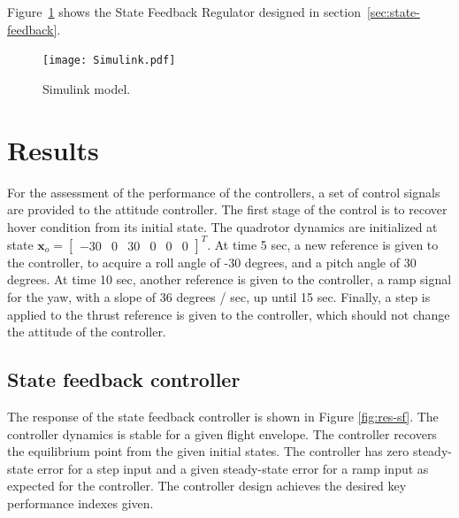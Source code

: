 \documentclass[12pt]{article}
\begin{document}
Figure~\ref{fig:simulink} shows the State Feedback Regulator designed in section~\ref{sec:state-feedback}. 

\begin{figure}
  \centering
  \texttt{[image: Simulink.pdf]}
  \caption{Simulink model.}
  \label{fig:simulink}
\end{figure}

\section{Results}

For the assessment of the performance of the controllers, a set of control signals are provided to the attitude controller. The first stage of the control is to recover hover condition from its initial state. The quadrotor dynamics are initialized at state $ \mathbf{x}_o = \begin{bmatrix} -30 & 0 & 30 & 0 & 0 & 0 \end{bmatrix}^T $. At time 5 sec, a new reference is given to the controller, to acquire a roll angle of -30 degrees, and a pitch angle of 30 degrees. At time 10 sec, another reference is given to the controller, a ramp signal for the yaw, with a slope of 36 degrees / sec, up until 15 sec. Finally, a step is applied to the thrust reference is given to the controller, which should not change the attitude of the controller.

\subsection{State feedback controller}

The response of the state feedback controller is shown in Figure \ref{fig:res-sf}. The controller dynamics is stable for a given flight envelope. The controller recovers the equilibrium point from the given initial states. The controller has zero steady-state error for a step input and a given steady-state error for a ramp input as expected for the controller. The controller design achieves the desired key performance indexes given.
\end{document}
